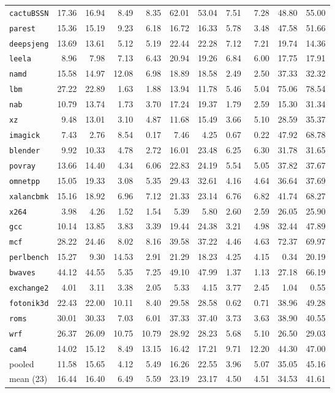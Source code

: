 \documentclass[10pt,a4paper]{article}
\newcommand{\ct}[1]{\texttt{#1}}
\begin{document}
{\begin{longtable}{@{}lrrrrrrrrrr@{}}
\bottomrule
\endlastfoot
\ct{cactuBSSN} & 17.36 & 16.94 & 8.49 & 8.35 & 62.01 & 53.04 & 7.51 & 7.28 & 48.80 & 55.00 \\
\ct{parest} & 15.36 & 15.19 & 9.23 & 6.18 & 16.72 & 16.33 & 5.78 & 3.48 & 47.58 & 51.66 \\
\ct{deepsjeng} & 13.69 & 13.61 & 5.12 & 5.19 & 22.44 & 22.28 & 7.12 & 7.21 & 19.74 & 14.36 \\
\ct{leela} & 8.96 & 7.98 & 7.13 & 6.43 & 20.94 & 19.26 & 6.84 & 6.00 & 17.75 & 17.91 \\
\ct{namd} & 15.58 & 14.97 & 12.08 & 6.98 & 18.89 & 18.58 & 2.49 & 2.50 & 37.33 & 32.32 \\
\ct{lbm} & 27.22 & 22.89 & 1.63 & 1.88 & 13.94 & 11.78 & 5.46 & 5.04 & 75.06 & 78.54 \\
\ct{nab} & 10.79 & 13.74 & 1.73 & 3.70 & 17.24 & 19.37 & 1.79 & 2.59 & 15.30 & 31.34 \\
\ct{xz} & 9.48 & 13.01 & 3.10 & 4.87 & 11.68 & 15.49 & 3.66 & 5.10 & 28.59 & 35.37 \\
\ct{imagick} & 7.43 & 2.76 & 8.54 & 0.17 & 7.46 & 4.25 & 0.67 & 0.22 & 47.92 & 68.78 \\
\ct{blender} & 9.92 & 10.33 & 4.78 & 2.72 & 16.01 & 23.48 & 6.25 & 6.30 & 31.78 & 31.65 \\
\ct{povray} & 13.66 & 14.40 & 4.34 & 6.06 & 22.83 & 24.19 & 5.54 & 5.05 & 37.82 & 37.67 \\
\ct{omnetpp} & 15.05 & 19.33 & 3.08 & 5.35 & 29.43 & 32.61 & 4.16 & 4.64 & 36.64 & 37.69 \\
\ct{xalancbmk} & 15.16 & 18.92 & 6.96 & 7.12 & 21.33 & 23.14 & 6.76 & 6.82 & 41.74 & 68.27 \\
\ct{x264} & 3.98 & 4.26 & 1.52 & 1.54 & 5.39 & 5.80 & 2.60 & 2.59 & 26.05 & 25.90 \\
\ct{gcc} & 10.14 & 13.85 & 3.83 & 3.39 & 19.44 & 24.38 & 3.21 & 4.98 & 32.44 & 47.89 \\
\ct{mcf} & 28.22 & 24.46 & 8.02 & 8.16 & 39.58 & 37.22 & 4.46 & 4.63 & 72.37 & 69.97 \\
\ct{perlbench} & 15.27 & 9.30 & 14.53 & 2.91 & 21.29 & 18.23 & 4.25 & 4.15 & 0.34 & 20.19 \\
\ct{bwaves} & 44.12 & 44.55 & 5.35 & 7.25 & 49.10 & 47.99 & 1.37 & 1.13 & 27.18 & 66.19 \\
\ct{exchange2} & 4.01 & 3.11 & 3.38 & 2.05 & 5.33 & 4.15 & 3.77 & 2.45 & 1.04 & 0.55 \\
\ct{fotonik3d} & 22.43 & 22.00 & 10.11 & 8.40 & 29.58 & 28.58 & 0.62 & 0.71 & 38.96 & 49.28 \\
\ct{roms} & 30.01 & 30.33 & 7.03 & 6.01 & 37.33 & 37.40 & 3.73 & 3.63 & 38.90 & 40.55 \\
\ct{wrf} & 26.37 & 26.09 & 10.75 & 10.79 & 28.92 & 28.23 & 5.68 & 5.10 & 26.50 & 29.03 \\
\ct{cam4} & 14.02 & 15.12 & 8.49 & 13.15 & 16.42 & 17.21 & 9.71 & 12.20 & 44.30 & 47.00 \\
\midrule
pooled & 11.58 & 15.65 & 4.12 & 5.49 & 16.26 & 22.55 & 3.96 & 5.07 & 35.05 & 45.16 \\
mean (23) & 16.44 & 16.40 & 6.49 & 5.59 & 23.19 & 23.17 & 4.50 & 4.51 & 34.53 & 41.61 \\
\end{longtable}
}
\end{document}
